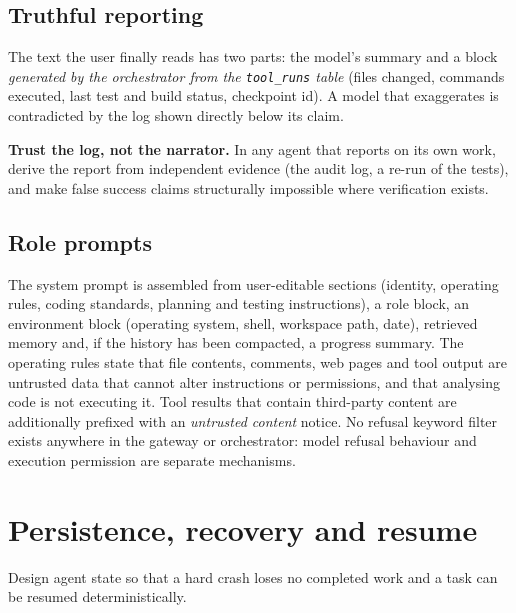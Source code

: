 \documentclass[11pt,a4paper]{article}
\begin{document}
\subsection{Truthful reporting}
The text the user finally reads has two parts: the model's summary and a block \emph{generated by the orchestrator from the \texttt{tool\_runs} table} (files changed, commands executed, last test and build status, checkpoint id).
A model that exaggerates is contradicted by the log shown directly below its claim.

\begin{keyidea}
\textbf{Trust the log, not the narrator.} In any agent that reports on its own work, derive the report from independent evidence (the audit log, a re-run of the tests), and make false success claims
structurally impossible where verification exists.
\end{keyidea}

\subsection{Role prompts}\label{sec:prompts}
The system prompt is assembled from user-editable sections (identity, operating rules, coding standards, planning and testing instructions), a role block, an environment block (operating system, shell, workspace path, date), retrieved memory
and, if the history has been compacted, a progress summary. The operating rules state that file contents, comments, web pages and tool output are untrusted data that cannot alter instructions or permissions, and that analysing code is not executing it.
Tool results that contain third-party content are additionally prefixed with an \emph{untrusted content} notice. No refusal keyword filter exists anywhere in the gateway or orchestrator: model refusal behaviour and execution permission are separate mechanisms.

\section{Persistence, recovery and resume}\label{sec:persist}
\begin{objectives}
Design agent state so that a hard crash loses no completed work and a task can be resumed deterministically.
\end{objectives}
\end{document}

